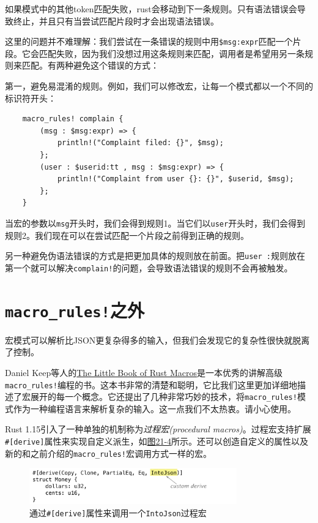如果模式中的其他token匹配失败，rust会移动到下一条规则。只有语法错误会导致终止，并且只有当尝试匹配片段时才会出现语法错误。

这里的问题并不难理解：我们尝试在一条错误的规则中用\texttt{\$msg:expr}匹配一个片段。它会匹配失败，因为我们没想过用这条规则来匹配，调用者是希望用另一条规则来匹配。有两种避免这个错误的方式：

第一，避免易混淆的规则。例如，我们可以修改宏，让每一个模式都以一个不同的标识符开头：
\begin{verbatim}
    macro_rules! complain {
        (msg : $msg:expr) => {
            println!("Complaint filed: {}", $msg);
        };
        (user : $userid:tt , msg : $msg:expr) => {
            println!("Complaint from user {}: {}", $userid, $msg);
        };
    }
\end{verbatim}

当宏的参数以\texttt{msg}开头时，我们会得到规则1。当它们以\texttt{user}开头时，我们会得到规则2。我们现在可以在尝试匹配一个片段之前得到正确的规则。

另一种避免伪语法错误的方式是把更加具体的规则放在前面。把\texttt{user :}规则放在第一个就可以解决\texttt{complain!}的问题，会导致语法错误的规则不会再被触发。

\section{\texttt{macro\_rules!}之外}
宏模式可以解析比JSON更复杂得多的输入，但我们会发现它的复杂性很快就脱离了控制。

Daniel Keep等人的\href{https://danielkeep.github.io/tlborm/book/}{The Little Book of Rust Macros}是一本优秀的讲解高级\texttt{macro\_rules!}编程的书。这本书非常的清楚和聪明，它比我们这里更加详细地描述了宏展开的每一个概念。它还提出了几种非常巧妙的技术，将\texttt{macro\_rules!}模式作为一种编程语言来解析复杂的输入。这一点我们不太热衷。请小心使用。

Rust 1.15引入了一种单独的机制称为\emph{过程宏(procedural macros)}。过程宏支持扩展\\
\texttt{\#[derive]}属性来实现自定义派生，如\hyperref[f21-4]{图21-4}所示。还可以创造自定义的属性以及新的和之前介绍的\texttt{macro\_rules!}宏调用方式一样的宏。

\begin{figure}[htbp]
    \centering
    \includegraphics[width=0.8\textwidth]{../img/f21-4.png}
    \caption{通过\texttt{\#[derive]}属性来调用一个\texttt{IntoJson}过程宏}
    \label{f21-4}
\end{figure}

